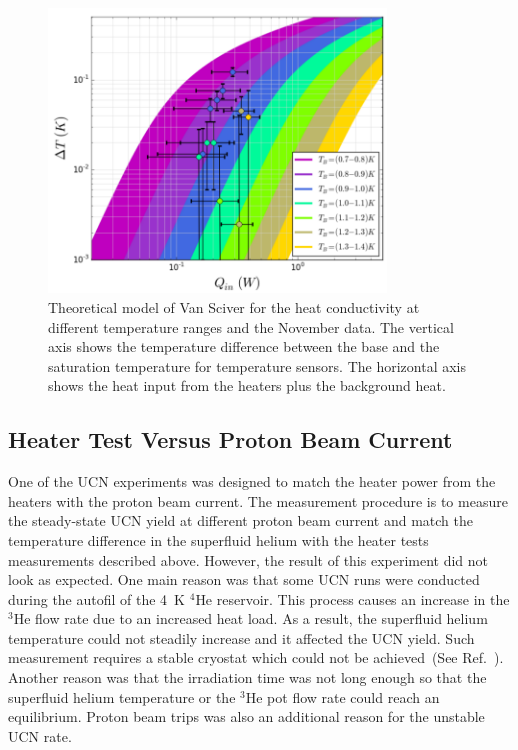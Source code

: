 \begin{figure}[h!]
  \centering \includegraphics[width=0.8\textwidth]{November_Data.png}
  \caption{Theoretical model of Van Sciver for the heat conductivity
    at different temperature ranges and the November data. The
    vertical axis shows the temperature difference between the base
    and the saturation temperature for temperature sensors. The
    horizontal axis shows the heat input from the heaters plus the
    background heat.}
\label{fig:November_Data}
\end{figure}

\subsection{Heater Test Versus Proton Beam Current}
One of the UCN experiments was designed to match the heater power from
the heaters with the proton beam current. The measurement procedure is
to measure the steady-state UCN yield at different proton beam current
and match the temperature difference in the superfluid helium with the
heater tests measurements described above. However, the result of this
experiment did not look as expected. One main reason was that some UCN
runs were conducted during the autofil of the 4~K $^4$He
reservoir. This process causes an increase in the $^3$He flow rate due
to an increased heat load. As a result, the superfluid helium
temperature could not steadily increase and it affected the UCN
yield. Such measurement requires a stable cryostat which could not be
achieved~(See Ref.~\cite{UCNreport}). Another reason was that the
irradiation time was not long enough so that the superfluid helium
temperature or the $^3$He pot flow rate could reach an
equilibrium. Proton beam trips was also an additional reason for the
unstable UCN rate.


